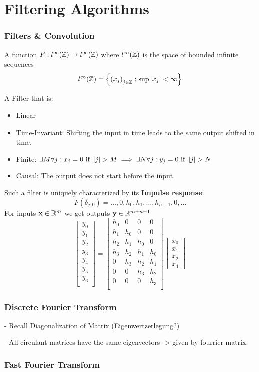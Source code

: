 \columnbreak

\part{Filtering Algorithms}
\setcounter{section}{0}

\section{Filters \& Convolution}

\Def[Filter] A function $F: l^\infty(\mathbb{Z}) \rightarrow l^\infty(\mathbb{Z})$ where $l^\infty(\mathbb{Z})$ is the space of bounded infinite sequences
$$
l^\infty(\mathbb{Z}) = \left\{\left(x_{j}\right)_{j \in \mathbb{Z}}: \sup \left|x_{j}\right|<\infty\right\}
$$

\Def[LT-FIR] A Filter that is: \begin{itemize}
	\item Linear
	\item Time-Invariant: Shifting the input in time leads to the same output shifted in time.
	\item Finite: $\exists M \forall j : x_j=0 \text{ if } \left\lvert j \right\rvert>M \implies \exists N \forall j : y_j=0 \text{ if } \left\lvert j \right\rvert>N$
	\item Causal: The output does not start before the input.
\end{itemize}
Such a filter is uniquely characterized by its \textbf{Impulse response}: $$F(\delta_{j, 0}) = \dots, 0, h_0, h_1, \dots, h_{n-1}, 0, \dots$$
For inputs $\mathbf{x} \in \mathbb{R}^m$ we get outputs $\mathbf{y} \in \mathbb{R}^{m+n-1}$
$$
\left[\begin{array}{l}
y_{0} \\
y_{1} \\
y_{2} \\
y_{3} \\
y_{4} \\
y_{5} \\
y_{6} \\
\end{array}\right]=\left[\begin{array}{cccc}
h_{0} & 0 & 0 & 0 \\
h_{1} & h_{0} & 0 & 0 \\
h_{2} & h_{1} & h_{0} & 0 \\
h_{3} & h_{2} & h_{1} & h_{0} \\
0 & h_{3} & h_{2} & h_{1} \\
0 & 0 & h_{3} & h_{2} \\
0 & 0 & 0 & h_{3} \\
\end{array}\right]\left[\begin{array}{l}
x_{0} \\
x_{1} \\
x_{2} \\
x_{4}
\end{array}\right]
$$

\section{Discrete Fourier Transform}

- Recall Diagonalization of Matrix (Eigenwertzerlegung?)

- All circulant matrices have the same eigenvectors -> given by fourrier-matrix.

\section{Fast Fourier Transform}